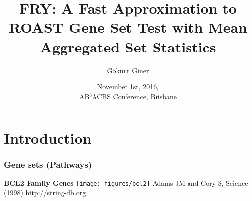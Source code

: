 \documentclass[9pt,t]{beamer}
\title{{\ttfamily FRY}: A Fast Approximation to {\ttfamily ROAST} Gene Set Test with Mean Aggregated Set Statistics}
\author[G\"{o}knur Giner]{G\"{o}knur Giner}
\date[November 1st, 2016]{November 1st, 2016,\\
AB$^3$ACBS Conference, Brisbane}
\begin{document}
\begin{frame}[plain,t]
	\titlepage
\end{frame}

\section{Introduction}
\begin{frame}
	\frametitle{Gene sets \textbf{\color{oxygenrose} (Pathways)}}
	\vspace{0.1cm}
\begin{minipage}[t][0.9\textheight][b]{0.6\textwidth}
\flushleft
\textbf{\color{oxygenpurple} BCL2 Family Genes}
\vspace{0.05cm}
\vfill
  \texttt{[image: figures/bcl2]}
\vfill
\flushleft
\footnotesize{Adams JM and Cory S, Science (1998)} 
\flushleft
\footnotesize{\url{http://string-db.org}}
\end{minipage}
\hspace{0.4cm}
\end{frame}
\end{document}
